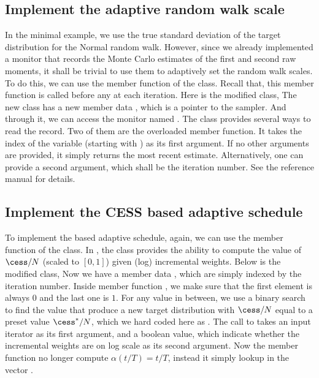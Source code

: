 \subsection{Implement the adaptive random walk scale}
\label{sub:Implement the adaptive random walk scale}

In the minimal example, we use the true standard deviation of the target
distribution for the Normal random walk. However, since we already implemented
a monitor that records the Monte Carlo estimates of the first and second raw
moments, it shall be trivial to use them to adaptively set the random walk
scales. To do this, we can use the  member function
of the  class. Recall that, this member function is
called before any  at each iteration. Here is the
modified  class,
The new class has a new member data , which is a pointer
to the sampler. And through it, we can access the monitor named
. The  class provides several ways to
read the record. Two of them are the overloaded  member
function. It takes the index of the variable (starting with ) as
its first argument. If no other arguments are provided, it simply returns the
most recent estimate. Alternatively, one can provide a second argument, which
shall be the iteration number. See the reference manual for details.

\subsection{Implement the CESS based adaptive schedule}
\label{sub:Implement the CESS based adaptive schedule}

To implement the \cess based adaptive schedule, again, we can use the member
function  of the  class. In
\vsmc, the  class provides the ability to compute the
value of $\cess/N$ (scaled to $[0,1]$) given (log) incremental weights. Below
is the modified  class,
Now we have a member data , which are simply indexed by the
iteration number. Inside member function , we make
sure that the first element is always $0$ and the last one is $1$. For any
value in between, we use a binary search to find the value that produce a new
target distribution with $\cess/N$ equal to a preset value $\cess^*/N$, which
we hard coded here as . The call to
 takes an input iterator as its first argument, and
a boolean value, which indicate whether the incremental weights are on log
scale as its second argument. Now the  member function no
longer compute $\alpha(t/T) = t/T$, instead it simply lookup in the vector
.

